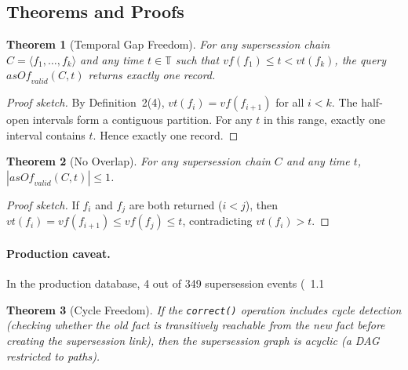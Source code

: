 \documentclass{article}
\newtheorem{theorem}{Theorem}
\begin{document}
\subsection{Theorems and Proofs}

\begin{theorem}[Temporal Gap Freedom]
\label{thm:gapfree}
For any supersession chain $C = \langle f_1, \ldots, f_k \rangle$ and any time $t \in \mathbb{T}$ such that $\mathit{vf}(f_1) \leq t < \mathit{vt}(f_k)$, the query $\mathit{asOf}_{\mathit{valid}}(C, t)$ returns exactly one record.
\end{theorem}

\begin{proof}[Proof sketch]
By Definition~2(4), $\mathit{vt}(f_i) = \mathit{vf}(f_{i+1})$ for all $i < k$. The half-open intervals form a contiguous partition. For any $t$ in this range, exactly one interval contains $t$. Hence exactly one record.
\end{proof}

\begin{theorem}[No Overlap]
\label{thm:nooverlap}
For any supersession chain $C$ and any time $t$, $|\mathit{asOf}_{\mathit{valid}}(C, t)| \leq 1$.
\end{theorem}

\begin{proof}[Proof sketch]
If $f_i$ and $f_j$ are both returned ($i < j$), then $\mathit{vt}(f_i) = \mathit{vf}(f_{i+1}) \leq \mathit{vf}(f_j) \leq t$, contradicting $\mathit{vt}(f_i) > t$.
\end{proof}
\paragraph{Production caveat.} In the production database, 4 out of 349 supersession events (~1.1%

\begin{theorem}[Cycle Freedom]
\label{thm:cyclefree}
If the \texttt{correct()} operation includes cycle detection (checking whether the old fact is transitively reachable from the new fact before creating the supersession link), then the supersession graph is acyclic (a DAG restricted to paths).
\end{theorem}
\end{document}
